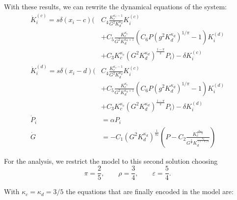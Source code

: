 With these results, we can rewrite the dynamical equations of the system:
\begin{align}
	\dot{K}_i^{(c)} = s \delta(x_i - c) \bigg(& C_4 \frac{K_c^{\kappa_c-1}}{G^2 K_d^{\kappa_d}} K_i^{(c)} \nonumber \\
	&+ C_5 \frac{K_c^{\kappa_c}}{G^2 K_d^{\kappa_d + 1}}\left( C_6 P (g^2 K_d^{\kappa_d})^{1/\pi} -1 \right) K_i^{(d)} \nonumber \\ 
	&+ C_3 K_c^{\kappa_c}(G^2K_d^{\kappa_d})^{\frac{1-\pi}{\pi}} P_i \bigg) - \delta K_i^{(c)} \\
	\dot{K}_i^{(d)} = s \delta(x_i - d) \bigg(& C_4 \frac{K_c^{\kappa_c-1}}{G^2 K_d^{\kappa_d}} K_i^{(c)} \nonumber \\
	&+ C_5 \frac{K_c^{\kappa_c}}{G^2 K_d^{\kappa_d + 1}}\left( C_6 P (g^2 K_d^{\kappa_d})^{1/\pi} -1 \right) K_i^{(d)} \nonumber \\ 
	&+ C_3 K_c^{\kappa_c}(G^2K_d^{\kappa_d})^{\frac{1-\pi}{\pi}} P_i \bigg) - \delta K_i^{(d)} \\
	\dot{P}_i &= \alpha P_i \nonumber \\
	\dot{G} &= - C_1(G^2 K_d^{\kappa_d})^{\frac{1}{\pi \varepsilon}}\left( P - C_2 \frac{K_c^{\frac{\kappa_c}{1-\pi}}}{G^{\frac{2}{\pi}}K_d^{\frac{\kappa_d}{(1-\pi)\pi}}} \right) 
\end{align}

For the analysis, we restrict the model to this second solution choosing 
\begin{equation}
	\pi = \frac{2}{5}, \qquad \rho = \frac{3}{4}, \qquad \varepsilon = \frac{5}{4}.
	\label{exponent_values}
\end{equation}

With $\kappa_c = \kappa_d = 3/5$ the equations that are finally encoded in the model are:

